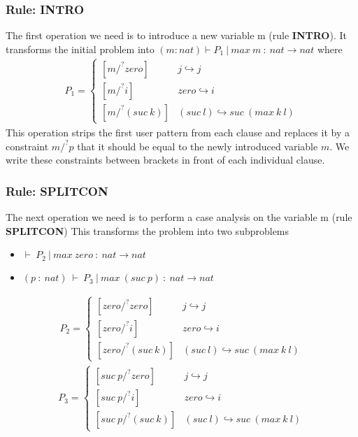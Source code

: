 \documentclass[10pt, xelatex, hyperref={pdfpagelabels=false,breaklinks}]{beamer}
\begin{document}
\begin{frame}[fragile]
  \frametitle{Rule: INTRO}
  The first operation we need is to introduce a new variable m (rule \textbf{INTRO}). It transforms the initial problem into $(m: nat) ⊢ P_1\ |\ max\ m\ :\ nat → nat$ where
  \begin{align*}
    P_1 =
      \begin{cases}
        [m /^? {zero}] & j \hookrightarrow j \\
        [m /^? i] & zero \hookrightarrow i \\
        [m /^? {(suc\ k)}] & (suc\ l) \hookrightarrow suc\ (max\ k\ l) 
      \end{cases}       
  \end{align*}
  This operation strips the first user pattern from each clause and replaces it by a constraint $m /^? p$ that it should be equal to the newly introduced variable $m$. We write these constraints between brackets in front of each individual clause.
\end{frame}

\begin{frame}[fragile]
  \frametitle{Rule: SPLITCON}
  The next operation we need is to perform a case analysis on the variable m (rule \textbf{SPLITCON}) This transforms the problem into two subproblems
  \begin{itemize}
    \item $⊢\ P_2\ |\ max\ zero\ :\ nat → nat$
    \item $(p\ :\ nat)\ ⊢\ P_3\ |\ max\ (suc\ p)\ :\ nat → nat$
  \end{itemize}
  \begin{align*}
    P_2 =
      \begin{cases}
        [zero /^? {zero}] & j \hookrightarrow j \\
        [zero /^? i] & zero \hookrightarrow i \\
        [zero /^? {(suc\ k)}] & (suc\ l) \hookrightarrow suc\ (max\ k\ l) 
      \end{cases}       
  \end{align*}
  \begin{align*}
    P_3 =
      \begin{cases}
        [suc\ p /^? {zero}] & j \hookrightarrow j \\
        [suc\ p /^? i] & zero \hookrightarrow i \\
        [suc\ p /^? {(suc\ k)}] & (suc\ l) \hookrightarrow suc\ (max\ k\ l) 
      \end{cases}       
  \end{align*}

\end{frame}
\end{document}
